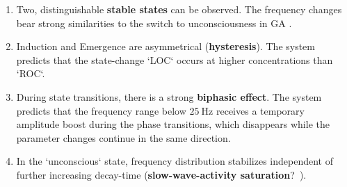 \begin{enumerate}

    \item Two, distinguishable \textbf{stable states} can be observed.
    The frequency changes bear strong similarities to the switch to unconsciousness in GA
    \cite{purdon_electroencephalogram_2013, ni_mhuircheartaigh_slow_wave_2013}.
    \item Induction and Emergence are asymmetrical (\textbf{hysteresis}).
    The system predicts that the state-change `LOC` occurs at higher concentrations than `ROC`.

    \item During state transitions, there is a strong \textbf{biphasic effect}.
    The system predicts that the frequency range below $\SI{25}{\hertz}$ receives a temporary amplitude boost during
    the phase transitions, which disappears while the parameter changes continue in the same direction.
    \item In the `unconscious` state, frequency distribution stabilizes independent of further increasing decay-time
    (\textbf{slow-wave-activity saturation}?~\cite{ni_mhuircheartaigh_slow_wave_2013}).

\end{enumerate}


